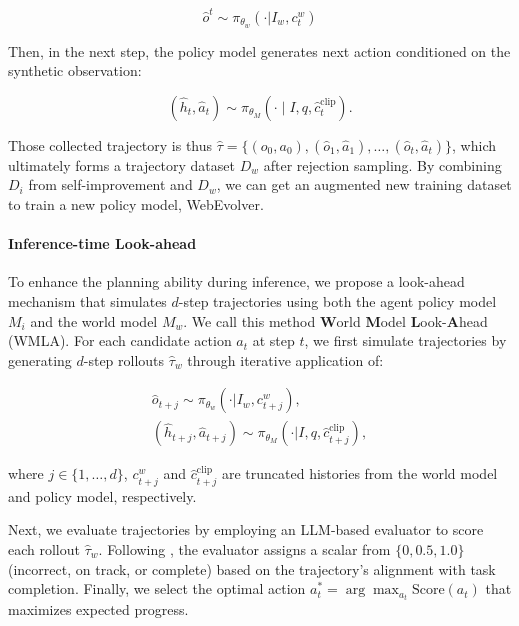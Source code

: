 \documentclass[11pt]{article}
\begin{document}
\begin{equation} \label{equation:wm_synthetic_observation}
\hat{o}^t \sim \pi_{\theta_w}(\cdot|I_w, c^w_t)
\end{equation}

Then, in the next step, the policy model generates next action conditioned on the synthetic observation:

\begin{equation} \label{equation:wm_synthetic_action}
    (\hat{h}_t, \hat{a}_t) \sim \pi_{\theta_M}(\cdot \mid I, q, \hat{c}_t^{\text{clip}}).
\end{equation}

Those collected trajectory is thus $\hat{\tau} = \{(o_0, a_0), (\hat{o}_1, \hat{a}_1), \dots, (\hat{o}_t, \hat{a}_t)\} $, which ultimately forms a trajectory dataset $D_w$ after rejection sampling. By combining $D_i$ from self-improvement and $D_w$, we can get an augmented new training dataset to train a new policy model, WebEvolver.



\paragraph{Inference-time Look-ahead}

To enhance the planning ability during inference, 
we propose a look-ahead mechanism that simulates $d$-step trajectories using both the agent policy model $M_i$ and the world model $M_w$. 
We call this method \textbf{W}orld \textbf{M}odel \textbf{L}ook-\textbf{A}head (WMLA).
For each candidate action $a_t$ at step $t$, 
we first simulate trajectories by generating $d$-step rollouts $\hat{\tau}_w$ through iterative application of:
\vspace{-1em}

\begin{align} \label{eq:WMLA}
    \hat{o}_{t+j} \sim \pi_{\theta_w}(\cdot | I_w, c^w_{t+j}), \quad  \nonumber \\
    (\hat{h}_{t+j}, \hat{a}_{t+j}) \sim \pi_{\theta_M}(\cdot | I, q, \hat{c}^\text{clip}_{t+j}),
\end{align}

where $j\in \{1, \dots, d\}$, $c^w_{t+j}$ and $\hat{c}^\text{clip}_{t+j}$ are truncated histories from the world model and policy model, respectively. 

Next, we evaluate trajectories by employing an LLM-based evaluator to score each rollout $\hat{\tau}_w$. Following \citet{AgentTreeSearch, webdreamer}, the evaluator assigns a scalar from $\{0, 0.5, 1.0\}$ (incorrect, on track, or complete) based on the trajectory's alignment with task completion. 
Finally, we select the optimal action $a^*_t = \arg\max_{a_t} \text{Score}(a_t)$ that maximizes expected progress.
\end{document}
